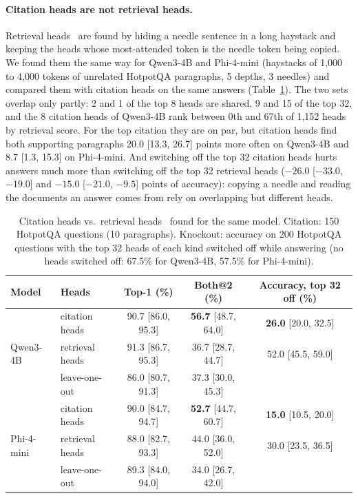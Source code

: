 \documentclass[11pt]{article}
\newcommand{\best}[1]{\textbf{#1}}
\begin{document}
\paragraph{Citation heads are not retrieval heads.}
\label{sec:retrieval}
Retrieval heads~\citep{wu2024retrievalhead} are found by hiding a needle sentence in a long haystack and keeping the heads whose most-attended token is the needle token being copied. We found them the same way for Qwen3-4B and Phi-4-mini (haystacks of 1{,}000 to 4{,}000 tokens of unrelated HotpotQA paragraphs, 5 depths, 3 needles) and compared them with citation heads on the same answers (Table~\ref{tab:retrieval}). The two sets overlap only partly: 2 and 1 of the top 8 heads are shared, 9 and 15 of the top 32, and the 8 citation heads of Qwen3-4B rank between 0th and 67th of 1{,}152 heads by retrieval score. For the top citation they are on par, but citation heads find both supporting paragraphs 20.0 [13.3, 26.7] points more often on Qwen3-4B and 8.7 [1.3, 15.3] on Phi-4-mini. And switching off the top 32 citation heads hurts answers much more than switching off the top 32 retrieval heads ($-26.0$ [$-33.0$, $-19.0$] and $-15.0$ [$-21.0$, $-9.5$] points of accuracy): copying a needle and reading the documents an answer comes from rely on overlapping but different heads.

\begin{table}[t]
\centering
\small
\caption{Citation heads vs.\ retrieval heads~\citep{wu2024retrievalhead} found for the same model. Citation: 150 HotpotQA questions (10 paragraphs). Knockout: accuracy on 200 HotpotQA questions with the top 32 heads of each kind switched off while answering (no heads switched off: 67.5\% for Qwen3-4B, 57.5\% for Phi-4-mini).}
\label{tab:retrieval}
\begin{tabular}{llccc}
\toprule
Model & Heads & Top-1 (\%) & Both@2 (\%) & Accuracy, top 32 off (\%) \\
\midrule
\multirow{3}{*}{Qwen3-4B} & citation heads & 90.7 [86.0, 95.3] & \best{56.7} [48.7, 64.0] & \best{26.0} [20.0, 32.5] \\
& retrieval heads & 91.3 [86.7, 95.3] & 36.7 [28.7, 44.7] & 52.0 [45.5, 59.0] \\
& leave-one-out & 86.0 [80.7, 91.3] & 37.3 [30.0, 45.3] & \\
\midrule
\multirow{3}{*}{Phi-4-mini} & citation heads & 90.0 [84.7, 94.7] & \best{52.7} [44.7, 60.7] & \best{15.0} [10.5, 20.0] \\
& retrieval heads & 88.0 [82.7, 93.3] & 44.0 [36.0, 52.0] & 30.0 [23.5, 36.5] \\
& leave-one-out & 89.3 [84.0, 94.0] & 34.0 [26.7, 42.0] & \\
\bottomrule
\end{tabular}
\end{table}
\end{document}
